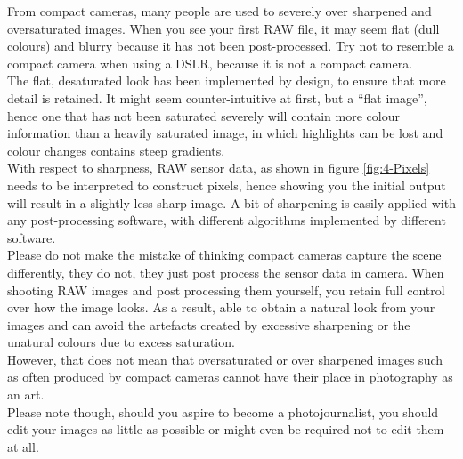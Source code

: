 From compact cameras, many people are used to severely over sharpened and oversaturated images. When you see your first \gls{RAW} file, it may seem flat (dull colours) and blurry because it has not been post-processed. Try not to resemble a compact camera when using a \gls{DSLR}, because it is not a compact camera.
\\[\baselineskip]
The flat, desaturated look has been implemented by design, to ensure that more detail is retained. It might seem counter-intuitive at first, but a ``flat image'', hence one that has not been saturated severely will contain more colour information than a heavily saturated image, in which highlights can be lost and colour changes contains steep gradients.
\\
With respect to sharpness, \gls{RAW} sensor data, as shown in figure \ref{fig:4-Pixels} needs to be interpreted to construct pixels, hence showing you the initial output will result in a slightly less sharp image. A bit of sharpening is easily applied with any post-processing software, with different algorithms implemented by different software.
\\[\baselineskip]
Please do not make the mistake of thinking compact cameras capture the scene differently, they do not, they just post process the sensor data in camera. When shooting \gls{RAW} images and post processing them yourself, you retain full control over how the image looks. As a result, able to obtain a natural look from your images and can avoid the artefacts created by excessive sharpening or the unatural colours due to excess saturation.
\\[\baselineskip]
However, that does not mean that oversaturated or over sharpened images such as often produced by compact cameras cannot have their place in photography as an art.
\\[\baselineskip]
Please note though, should you aspire to become a \gls{photojournalist}, you should edit your images as little as possible or might even be required not to edit them at all.